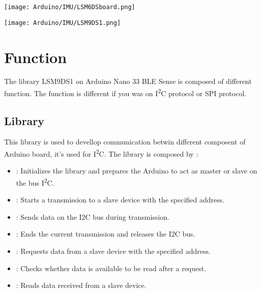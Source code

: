 \begin{center}
    \texttt{[image: Arduino/IMU/LSM6DSboard.png]}
\end{center}

\begin{center}	
    \texttt{[image: Arduino/IMU/LSM9DS1.png]}
\end{center}

\bigskip

\section{Function}

The library LSM9DS1 on Arduino Nano 33 BLE Sense is composed of different function. The function is different if you was on I\textsuperscript{2}C protocol or SPI protocol.


\subsection{Library }


This library is used to devellop communication betwin different composent of Arduino board, it's used for I\textsuperscript{2}C. The library  is composed by : 
\begin{itemize}
    
    \item {}: Initializes the library  and prepares the Arduino to act as master or slave on the bus I\textsuperscript{2}C.
    \item {}: Starts a transmission to a slave device with the specified address.
    \item {} : Sends data on the I2C bus during transmission.
    \item {} : Ends the current transmission and releases the I2C bus.
    \item {} : Requests data from a slave device with the specified address.
    \item {}: Checks whether data is available to be read after a request.
    \item {}: Reads data received from a slave device.
    
\end{itemize}

